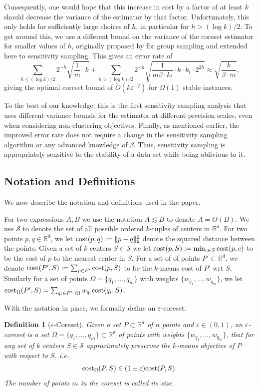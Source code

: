 \documentclass[11pt]{article}
\newtheorem{definition}[lemma]{Definition}
\theoremstyle{restate}
\theoremstyle{definition}
\newcommand{\eps}{\ensuremath{\varepsilon}}
\newcommand{\R}{\ensuremath{\mathbb{R}}}
\newcommand{\norm}[1]{\ensuremath{\|#1\|}}
\newcommand{\cost}{\textnormal{cost}}
\newcommand{\costom}{\cost_\Omega} %
\begin{document}
Consequently, one would hope that this increase in cost by a factor of at least $k$ should decrease the variance of the estimator by that factor. Unfortunately, this only holds for sufficiently large choices of $h$, in particular for $h>(\log k)/2$. To get around this, we use a different bound on the variance of the coreset estimator for smaller values of $h$, originally proposed by \cite{CSS21} for group sampling and extended here to sensitivity sampling. This gives an error rate of
\[\sum_{h\leq (\log k)/2} 2^{-h}\sqrt{\frac{1}{m}  \cdot k} + \sum_{h>  (\log k)/2}2^{-h}\sqrt{\frac{1}{m\beta\cdot k_t}  \cdot k\cdot k_t\cdot 2^{2h}}  \approx \sqrt{\frac{k}{\beta\cdot m}},\]
giving the optimal coreset bound of $\tilde{O}(k \eps^{-2})$ for $\Omega(1)$ stable instances. 

To the best of our knowledge, this is the first sensitivity sampling analysis that uses different variance bounds for the estimator at different precision scales, even when considering non-clustering objectives.
Finally, as mentioned earlier, the improved error rate does not require a change in the sensitivity sampling algorithm or any advanced knowledge of $\beta$. 
Thus, sensitivity sampling is appropriately sensitive to the stability of a data set while being oblivious to it.

\subsection{Notation and Definitions}
We now describe the notation and definitions used in the paper. 

For two expressions $A,B$ we use the notation $A \lesssim B$ to denote $A  = O(B)$.  We use  $\mathcal{S}$ to denote the set of all possible ordered $k$-tuples of centers in $\R^d$. For two points $p,q \in \R^d$, we let $\cost(p,q):= \norm{p -q}_2^2$ denote the squared distance between the points. Given a set of $k$ centers $S\in \mathcal{S}$ we let $\cost(p,S):= \min_{c \in S} \cost(p, c)$ to be the cost of $p$ to the nearest center in $S$.
For a set of of points  $P' \subset \R^d$,  we denote $\cost(P',S) := \sum_{p \in P'} \cost(p,S)$ to be the $k$-means cost of $P'$ wrt $S$. Similarly for a set of points $\Omega = \{q_1, \ldots, q_m\}$ with weights $\{w_{q_1}, \ldots, w_{q_m}\}$, we let $\costom(P',S) = \sum_{q_i \in P' \cap \Omega} w_{q_{i}} \cost(q_i, S)$.

With the notation in place, we formally define an  $\eps$-coreset. 


\begin{definition}[$\eps$-Coreset]
    Given a set $P \subset \R^d$ of $n$ points and $\eps \in (0,1)$, an $\eps$-coreset is a set $\Omega = \{q_1, \ldots, q_m\} \subset \R^d$ of points with weights $\{w_{q_1}, \ldots, w_{q_m}\}$, that for any set of $k$ centers $S\in \mathcal{S}$ approximately preserves the $k$-means objective of $P$ with respect to $S$, i.e., 
    \begin{align*}
        \costom(P,S) \in  (1\pm \eps) \cost(P,S).
    \end{align*}
The number of points $m$ in the coreset is called its \emph{size}.
\end{definition}
\end{document}
